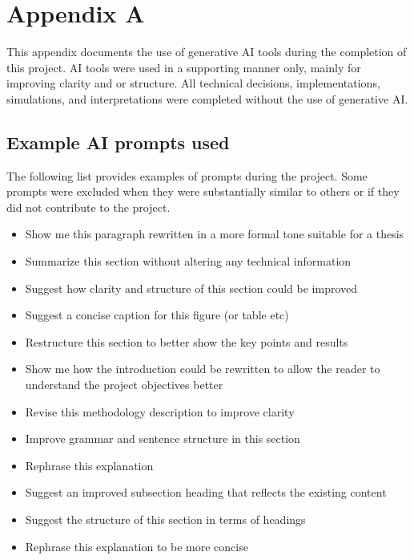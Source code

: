 \chapter{Appendix A}
This appendix documents the use of generative AI tools during the completion of this project. AI tools were used in a supporting manner only, mainly for improving clarity and or structure. All technical decisions, implementations, simulations, and interpretations were completed without the use of generative AI.


\section{Example AI prompts used}
The following list provides examples of prompts during the project. Some prompts were excluded when they were substantially similar to others or if they did not contribute to the project. 

\begin{itemize}
    \item Show me this paragraph rewritten in a more formal tone suitable for a thesis
    \item Summarize this section without altering any technical information
    \item Suggest how clarity and structure of this section could be improved 
    \item Suggest a concise caption for this figure (or table etc)
    \item Restructure this section to better show the key points and results 
    \item Show me how the introduction could be rewritten to allow the reader to understand the project objectives better
    \item Revise this methodology description to improve clarity
    \item Improve grammar and sentence structure in this section
    \item Rephrase this explanation
    \item Suggest an improved subsection heading that reflects the existing content
    \item Suggest the structure of this section in terms of headings
    \item Rephrase this explanation to be more concise
\end{itemize}


